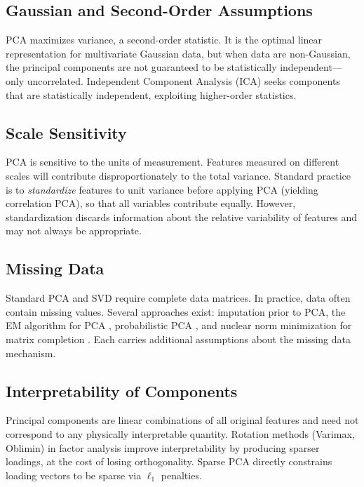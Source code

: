 \documentclass[conference]{IEEEtran}
\begin{document}
\subsection{Gaussian and Second-Order Assumptions}

PCA maximizes variance, a second-order statistic. It is the optimal linear representation for multivariate Gaussian data, but when data are non-Gaussian, the principal components are not guaranteed to be statistically independent—only uncorrelated. Independent Component Analysis (ICA) \cite{comon1994} seeks components that are statistically independent, exploiting higher-order statistics.

\subsection{Scale Sensitivity}

PCA is sensitive to the units of measurement. Features measured on different scales will contribute disproportionately to the total variance. Standard practice is to \emph{standardize} features to unit variance before applying PCA (yielding correlation PCA), so that all variables contribute equally. However, standardization discards information about the relative variability of features and may not always be appropriate.

\subsection{Missing Data}

Standard PCA and SVD require complete data matrices. In practice, data often contain missing values. Several approaches exist: imputation prior to PCA, the EM algorithm for PCA \cite{roweis1998}, probabilistic PCA \cite{tipping1999}, and nuclear norm minimization for matrix completion \cite{candes2009}. Each carries additional assumptions about the missing data mechanism.

\subsection{Interpretability of Components}

Principal components are linear combinations of all original features and need not correspond to any physically interpretable quantity. Rotation methods (Varimax, Oblimin) in factor analysis \cite{kaiser1958} improve interpretability by producing sparser loadings, at the cost of losing orthogonality. Sparse PCA \cite{zou2006} directly constrains loading vectors to be sparse via $\ell_1$ penalties.
\end{document}
